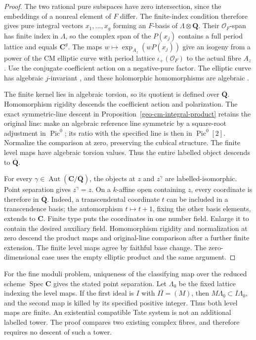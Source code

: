 \begin{proof}
The two rational pure subspaces have zero intersection, since the
embeddings of a nonreal element of $F$ differ. The finite-index
condition therefore gives pure integral vectors $x_1,\ldots,x_g$
forming an $F$-basis of $\Lambda\otimes\mathbf Q$.
Their $\mathcal O_F$-span has finite index in $\Lambda$, so the complex
span of the $P(x_j)$ contains a full period lattice and equals
$\mathbf C^g$.
The maps $w\mapsto\exp_{A_z}(wP(x_j))$ give an isogeny from a
power of the CM elliptic curve with period lattice
$\iota_+(\mathcal O_F)$ to the actual fibre $A_z$.
Use the conjugate coefficient action on a negative-pure factor.
The elliptic curve has algebraic $j$-invariant
\cite[Corollary~12.9]{cm-milne-mf}, and these holomorphic homomorphisms are algebraic
\cite[Theorems~2.8--2.9]{cm-milne-av}.

The finite kernel lies in algebraic torsion, so its quotient is defined
over $\overline{\mathbf Q}$. Homomorphism rigidity descends the
coefficient action and polarization. The exact symmetric-line descent
in Proposition~\ref{geo-cm-integral-product} retains the original line:
make an algebraic reference line symmetric by a square-root adjustment
in $\operatorname{Pic}^0$; its ratio with the specified line is then in
$\operatorname{Pic}^0[2]$. Normalize the comparison at zero, preserving
the cubical structure. The finite level maps have algebraic torsion
values. Thus the entire labelled object descends to
$\overline{\mathbf Q}$.

For every $\gamma\in\operatorname{Aut}(\mathbf C/\overline{\mathbf Q})$,
the objects at $z$ and $z^\gamma$ are labelled-isomorphic. Point
separation gives $z^\gamma=z$. On a $k$-affine open containing $z$,
every coordinate is therefore in $\overline{\mathbf Q}$. Indeed, a
transcendental coordinate $t$ can be included in a transcendence basis;
the automorphism $t\mapsto t+1$, fixing the other basis elements,
extends to $\mathbf C$. Finite type puts the coordinates in one number
field. Enlarge it to contain the desired auxiliary field.
Homomorphism rigidity and normalization at zero descend the product
maps and original-line comparison after a further finite extension.
The finite level maps agree by faithful base change.
The zero-dimensional case uses the empty elliptic
product and the same argument.
\end{proof}

For the fine moduli problem, uniqueness of the classifying map over
the reduced scheme $\operatorname{Spec}\mathbf C$ gives the stated
point separation. Let $\Lambda_0$ be the fixed lattice indexing the
level maps. If the first ideal is $I$ with $I\bar I=(M)$, then
$M\Lambda_0\subset I\Lambda_0$, and the second map is killed by
its specified positive integer. Thus both level maps are finite.
An existential compatible Tate system is not an additional labelled
tower. The proof compares two existing complex fibres, and therefore
requires no descent of such a tower.

